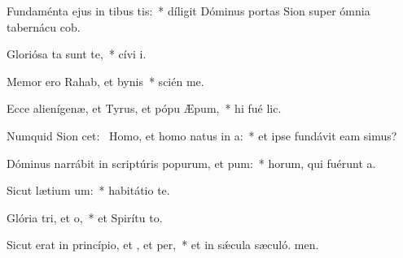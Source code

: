 \item Fundaménta ejus in tibus tis:~* díligit Dóminus portas Sion super ómnia tabernácu cob.
\item Gloriósa ta sunt  te,~* cívi i.
\item Memor ero Rahab, et bynis~* scién me.
\item Ecce alienígenæ, et Tyrus, et pópu Æpum,~* hi fué lic.
\item Numquid Sion cet:~\pscross{} Homo, et homo natus  in a:~* et ipse fundávit eam simus?
\item Dóminus narrábit in scriptúris popurum, et pum:~* horum, qui fuérunt  a.
\item Sicut lætium um:~* habitátio   te.
\item Glória tri, et o,~* et Spirítu to.
\item Sicut erat in princípio, et , et per,~* et in sǽcula sæculó. men.
